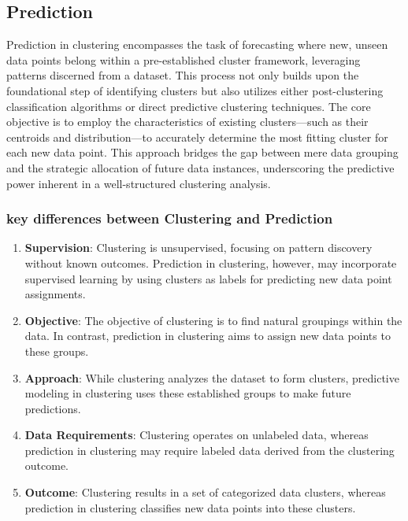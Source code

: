 \documentclass{article}
\begin{document}
\subsection{Prediction}

Prediction in clustering encompasses the task of forecasting where new, unseen data points belong within a pre-established cluster framework, leveraging patterns discerned from a dataset. This process not only builds upon the foundational step of identifying clusters but also utilizes either post-clustering classification algorithms or direct predictive clustering techniques. The core objective is to employ the characteristics of existing clusters—such as their centroids and distribution—to accurately determine the most fitting cluster for each new data point. This approach bridges the gap between mere data grouping and the strategic allocation of future data instances, underscoring the predictive power inherent in a well-structured clustering analysis.

\subsubsection*{key differences between Clustering and Prediction}

\begin{enumerate}
  \item \textbf{Supervision}: 
  Clustering is unsupervised, focusing on pattern discovery without known outcomes. Prediction in clustering, however, may incorporate supervised learning by using clusters as labels for predicting new data point assignments.
  \item \textbf{Objective}:
  The objective of clustering is to find natural groupings within the data. In contrast, prediction in clustering aims to assign new data points to these groups.
  \item \textbf{Approach}:
  While clustering analyzes the dataset to form clusters, predictive modeling in clustering uses these established groups to make future predictions.
  \item \textbf{Data Requirements}:
  Clustering operates on unlabeled data, whereas prediction in clustering may require labeled data derived from the clustering outcome.
  \item \textbf{Outcome}:
  Clustering results in a set of categorized data clusters, whereas prediction in clustering classifies new data points into these clusters.
  
\end{enumerate}
\end{document}
